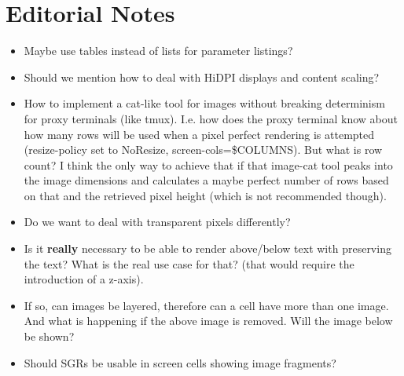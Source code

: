 \documentclass[a4paper]{article}
\begin{document}
\section{Editorial Notes} %

\begin{itemize}
    \item Maybe use tables instead of lists for parameter listings?
    \item Should we mention how to deal with HiDPI displays and content scaling?
    \item How to implement a cat-like tool for images without breaking determinism for proxy
        terminals (like tmux).
        I.e. how does the proxy terminal know about how many rows will be used when
        a pixel perfect rendering is attempted (resize-policy set to NoResize,
        screen-cols=\$COLUMNS). But what is row count?
        I think the only way to achieve that if that image-cat tool peaks into
        the image dimensions and calculates a maybe perfect number of rows
        based on that and the retrieved pixel height (which is not recommended though).
    \item Do we want to deal with transparent pixels differently?
    \item Is it \textbf{really} necessary to be able to render above/below text with preserving the
        text? What is the real use case for that? (that would require the introduction of a z-axis).
    \item If so, can images be layered, therefore can a cell have more than one image.
        And what is happening if the above image is removed. Will the image below be shown?
    \item Should SGRs be usable in screen cells showing image fragments?
\end{itemize}


\listoftodos
\end{document}
